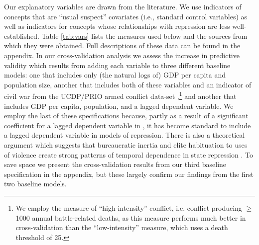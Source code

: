 \documentclass[11pt]{article}
\begin{document}
Our explanatory variables are drawn from the literature. We use indicators of concepts that are ``usual suspect'' covariates (i.e., standard control variables) as well as indicators for concepts whose relationships with repression are less well-established. Table \ref{tab:vars} lists the measures used below and the sources from which they were obtained. Full descriptions of these data can be found in the appendix. In our cross-validation analysis we assess the increase in predictive validity which results from adding each variable to three different baseline models: one that includes only (the natural logs of) GDP per capita and population size, another that includes both of these variables and an indicator of civil war from the UCDP/PRIO armed conflict data-set \citep{ThemnerWallensteen2012},\footnote{We employ the measure of ``high-intensity'' conflict, i.e. conflict producing $\geq$ 1000 annual battle-related deaths, as this measure performs much better in cross-validation than the ``low-intensity'' measure, which uses a death threshold of 25.} and another that includes GDP per capita, population, and a lagged dependent variable. We employ the last of these specifications because, partly as a result of a significant coefficient for a lagged dependent variable in \citet{PoeTate1994}, it has become standard to include a lagged dependent variable in models of repression. There is also a theoretical argument which suggests that bureaucratic inertia and elite habituation to uses of violence create strong patterns of temporal dependence  in state repression \citep[E.g.,][]{Gurr1988,Davenport2007}. To save space we present the cross-validation results from our third baseline specification in the appendix, but these largely confirm our findings from the first two baseline models. 
\end{document}
